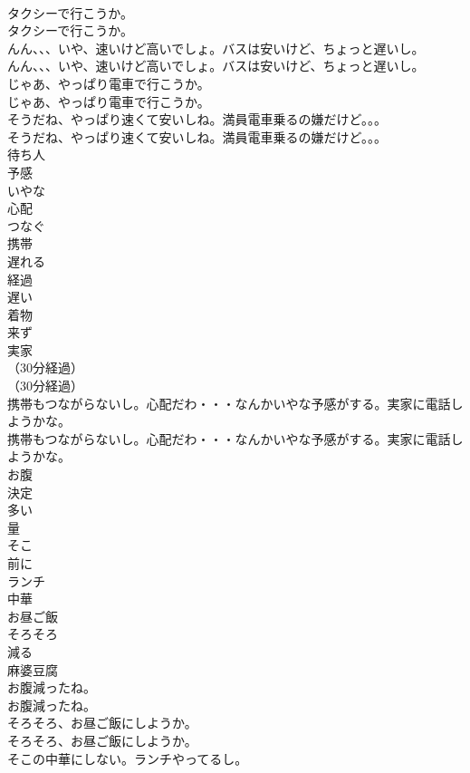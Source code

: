 \documentclass[8pt]{extreport}
\begin{document}
\begin{CJK}{UTF8}{min}
\\	タクシーで行こうか。	
\\	タクシーで行こうか。 
\\	んん、、、いや、速いけど高いでしょ。バスは安いけど、ちょっと遅いし。	
\\	んん、、、いや、速いけど高いでしょ。バスは安いけど、ちょっと遅いし。 
\\	じゃあ、やっぱり電車で行こうか。	
\\	じゃあ、やっぱり電車で行こうか。 
\\	そうだね、やっぱり速くて安いしね。満員電車乗るの嫌だけど。。。	
\\	そうだね、やっぱり速くて安いしね。満員電車乗るの嫌だけど。。。 
\\	待ち人
\\	予感
\\	いやな
\\	心配
\\	つなぐ
\\	携帯
\\	遅れる
\\	経過
\\	遅い
\\	着物
\\	来ず
\\	実家
\\	（30分経過）	
\\	（30分経過）	
\\	携帯もつながらないし。心配だわ・・・なんかいやな予感がする。実家に電話しようかな。	
\\	携帯もつながらないし。心配だわ・・・なんかいやな予感がする。実家に電話しようかな。 
\\	お腹
\\	決定
\\	多い
\\	量
\\	そこ
\\	前に
\\	ランチ
\\	中華
\\	お昼ご飯
\\	そろそろ
\\	減る
\\	麻婆豆腐
\\	お腹減ったね。	
\\	お腹減ったね。 
\\	そろそろ、お昼ご飯にしようか。	
\\	そろそろ、お昼ご飯にしようか。 
\\	そこの中華にしない。ランチやってるし。	

\end{CJK}
\end{document}
